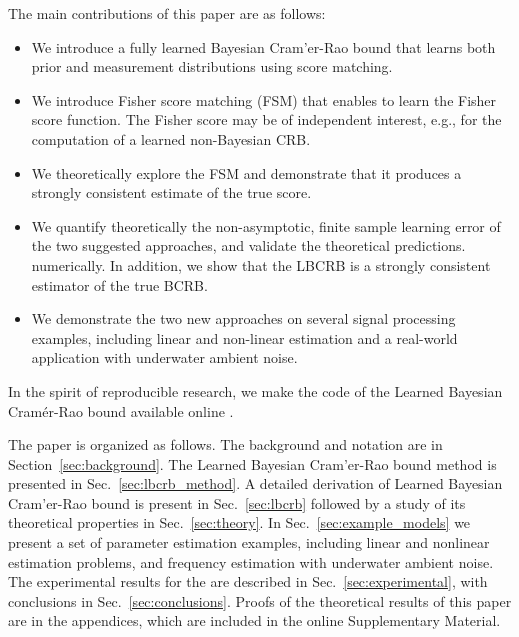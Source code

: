 \documentclass[journal,twoside,web]{ieeecolor}
\begin{document}
The {main} contributions of this paper are %
as follows:
\begin{itemize}
    \item We introduce a fully learned Bayesian Cram'er-Rao bound that learns both prior and measurement distributions using score matching.
    
    \item  We introduce Fisher score matching (FSM) that enables to learn the Fisher score function. %
    The Fisher score {%
    may be of independent}
    interest, 
    e.g., for the computation of {a learned} non-Bayesian CRB.
    \item  %
    We theoretically explore the FSM and demonstrate that {it produces a strongly consistent estimate of the true score.}
    \item  We {quantify theoretically the non-asymptotic, finite sample learning} error of the two suggested approaches, and validate {the theoretical predictions.}  numerically. %
    In addition, we show that the LBCRB is a strongly consistent {estimator of} the true BCRB. 

    \item  {We demonstrate the two new approaches} on several signal processing examples, including linear and non-linear estimation {and} a real-world application  with underwater ambient noise. 
\end{itemize}

In the spirit of reproducible research, we make the code of the Learned Bayesian Cram\'er-Rao bound available online \cite{lbcrb_repo}.

The paper is organized as follows. The background and notation are  in Section~\ref{sec:background}. 
The Learned Bayesian Cram'er-Rao bound method is presented in Sec.~\ref{sec:lbcrb_method}. A detailed derivation of Learned Bayesian Cram'er-Rao bound is present in Sec.~\ref{sec:lbcrb} followed by a {study} of its theoretical properties in Sec.~\ref{sec:theory}.   In Sec.~\ref{sec:example_models} we present a set of parameter estimation examples, including linear and nonlinear estimation problems, and frequency estimation with underwater ambient noise. The experimental results for the \name{} are described in Sec.~\ref{sec:experimental}, with conclusions in
Sec.~\ref{sec:conclusions}.
Proofs of the theoretical results of this paper are  in the appendices, which are included in the online Supplementary Material.
\end{document}
